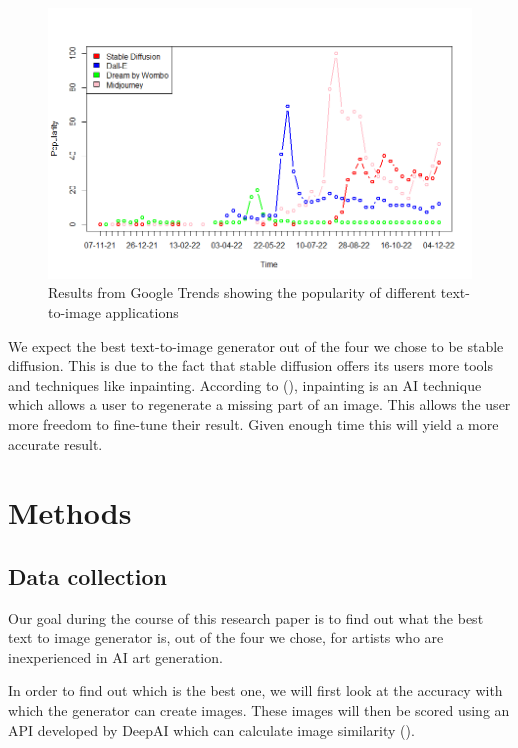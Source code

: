 \documentclass[]{report}
\begin{document}
	\begin{figure}[!h]
		\centering
		\includegraphics[width=1\linewidth]{TrendsPlotWithLegend}
		\caption{Results from Google Trends showing the popularity of different text-to-image applications}
		\label{fig:TrendsPlotWithLegend}
	\end{figure}
	
	
	We expect the best text-to-image generator out of the four we chose to be stable diffusion. This is due to the fact that stable diffusion offers its users more tools and techniques like inpainting. According to \citeauthor{inpaintingExplaination} (\citeyear{inpaintingExplaination}), inpainting is an AI technique which allows a user to regenerate a missing part of an image. This allows the user more freedom to fine-tune their result. Given enough time this will yield a more accurate result.
	
	\pagebreak
	
	\section{Methods}
	
	\subsection{Data collection}
	Our goal during the course of this research paper is to find out what the best text to image generator is, out of the four we chose, for artists who are inexperienced in AI art generation.
	
	In order to find out which is the best one, we will first look at the accuracy with which the generator can create images. These images will then be scored using an API developed by DeepAI which can calculate image similarity (\cite{imageSimilarity}). 
	
\end{document}
